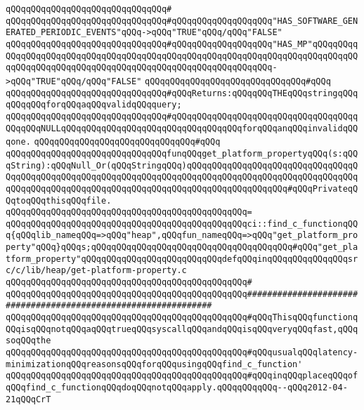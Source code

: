 \verb|qQQqqQQqqQQqqQQqqQQqqQQqqQQqqQQq#|\newline
\verb|qQQqqQQqqQQqqQQqqQQqqQQqqQQqqQQq#qQQqqQQqqQQqqQQqqQQq"HAS_SOFTWARE_GENERATED_PERIODIC_EVENTS"qQQq->qQQq"TRUE"qQQq/qQQq"FALSE"|\newline
\verb|qQQqqQQqqQQqqQQqqQQqqQQqqQQqqQQq#qQQqqQQqqQQqqQQqqQQq"HAS_MP"qQQqqQQqqQQqqQQqqQQqqQQqqQQqqQQqqQQqqQQqqQQqqQQqqQQqqQQqqQQqqQQqqQQqqQQqqQQqqQQqqQQqqQQqqQQqqQQqqQQqqQQqqQQqqQQqqQQqqQQqqQQqqQQqqQQq->qQQq"TRUE"qQQq/qQQq"FALSE"|\newline
\verb|qQQqqQQqqQQqqQQqqQQqqQQqqQQqqQQq#qQQq|\newline
\verb|qQQqqQQqqQQqqQQqqQQqqQQqqQQqqQQq#qQQqReturns:qQQqqQQqTHEqQQqstringqQQqqQQqqQQqforqQQqaqQQqvalidqQQqquery;|\newline
\verb|qQQqqQQqqQQqqQQqqQQqqQQqqQQqqQQq#qQQqqQQqqQQqqQQqqQQqqQQqqQQqqQQqqQQqqQQqqQQqNULLqQQqqQQqqQQqqQQqqQQqqQQqqQQqqQQqqQQqforqQQqanqQQqinvalidqQQqone.|\newline
\verb|qQQqqQQqqQQqqQQqqQQqqQQqqQQqqQQq#qQQq|\newline
\verb|qQQqqQQqqQQqqQQqqQQqqQQqqQQqqQQqfunqQQqget_platform_propertyqQQq(s:qQQqString):qQQqNull_Or(qQQqStringqQQq)qQQqqQQqqQQqqQQqqQQqqQQqqQQqqQQqqQQqqQQqqQQqqQQqqQQqqQQqqQQqqQQqqQQqqQQqqQQqqQQqqQQqqQQqqQQqqQQqqQQqqQQqqQQqqQQqqQQqqQQqqQQqqQQqqQQqqQQqqQQqqQQqqQQqqQQqqQQqqQQq#qQQqPrivateqQQqtoqQQqthisqQQqfile.|\newline
\verb|qQQqqQQqqQQqqQQqqQQqqQQqqQQqqQQqqQQqqQQqqQQqqQQq=|\newline
\verb|qQQqqQQqqQQqqQQqqQQqqQQqqQQqqQQqqQQqqQQqqQQqqQQqci::find_c_functionqQQq{qQQqlib_nameqQQq=>qQQq"heap",qQQqfun_nameqQQq=>qQQq"get_platform_property"qQQq}qQQqs;qQQqqQQqqQQqqQQqqQQqqQQqqQQqqQQqqQQqqQQq#qQQq"get_platform_property"qQQqqQQqqQQqqQQqqQQqqQQqqQQqdefqQQqinqQQqqQQqqQQqqQQqsrc/c/lib/heap/get-platform-property.c|\newline
\verb|qQQqqQQqqQQqqQQqqQQqqQQqqQQqqQQqqQQqqQQqqQQqqQQq#|\newline
\verb|qQQqqQQqqQQqqQQqqQQqqQQqqQQqqQQqqQQqqQQqqQQqqQQq###############################################################|\newline
\verb|qQQqqQQqqQQqqQQqqQQqqQQqqQQqqQQqqQQqqQQqqQQqqQQq#qQQqThisqQQqfunctionqQQqisqQQqnotqQQqaqQQqtrueqQQqsyscallqQQqandqQQqisqQQqveryqQQqfast,qQQqsoqQQqthe|\newline
\verb|qQQqqQQqqQQqqQQqqQQqqQQqqQQqqQQqqQQqqQQqqQQqqQQq#qQQqusualqQQqlatency-minimizationqQQqreasonsqQQqforqQQqusingqQQqfind_c_function'|\newline
\verb|qQQqqQQqqQQqqQQqqQQqqQQqqQQqqQQqqQQqqQQqqQQqqQQq#qQQqinqQQqplaceqQQqofqQQqfind_c_functionqQQqdoqQQqnotqQQqapply.qQQqqQQqqQQq--qQQq2012-04-21qQQqCrT|\newline
